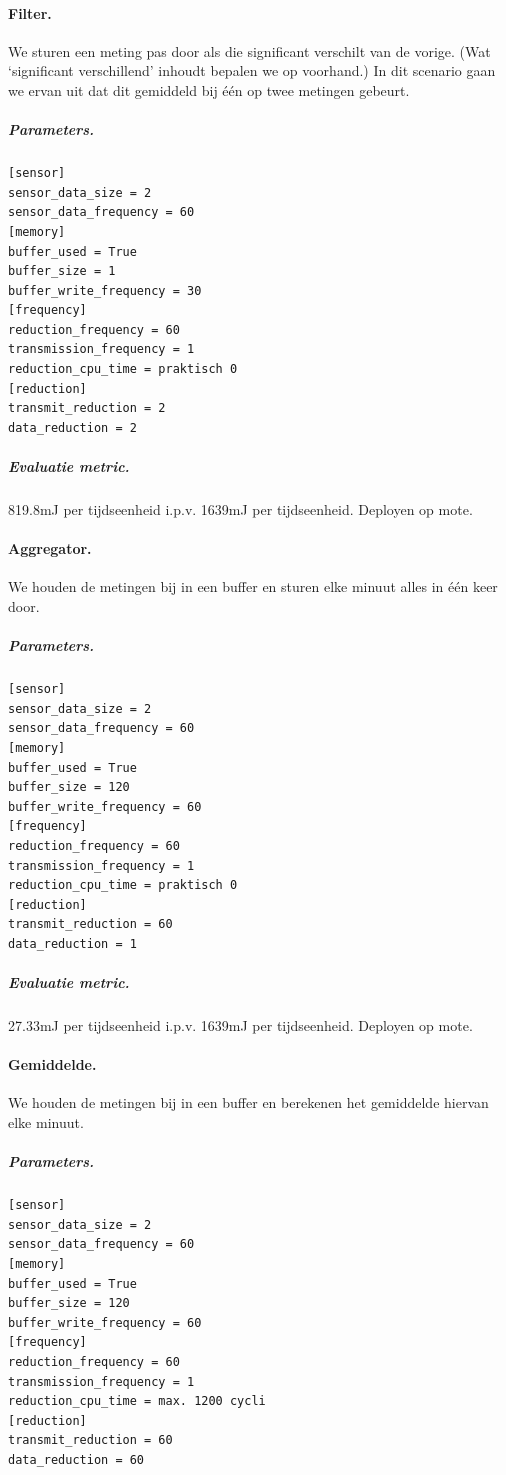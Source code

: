 \documentclass{article}
\begin{document}
\paragraph{Filter.} We sturen een meting pas door als die significant verschilt
van de vorige. (Wat `significant verschillend' inhoudt bepalen we op voorhand.)
In dit scenario gaan we ervan uit dat dit gemiddeld bij \'e\'en op twee metingen
gebeurt.

\subparagraph{Parameters.}
\begin{verbatim}
[sensor]
sensor_data_size = 2
sensor_data_frequency = 60
[memory]
buffer_used = True
buffer_size = 1
buffer_write_frequency = 30
[frequency]
reduction_frequency = 60
transmission_frequency = 1
reduction_cpu_time = praktisch 0
[reduction]
transmit_reduction = 2
data_reduction = 2
\end{verbatim}
\subparagraph{Evaluatie metric.} 819.8mJ per tijdseenheid i.p.v. 1639mJ per tijdseenheid. Deployen op mote.

\paragraph{Aggregator.} We houden de metingen bij in een buffer en sturen elke
minuut alles in \'e\'en keer door.

\subparagraph{Parameters.}
\begin{verbatim}
[sensor]
sensor_data_size = 2
sensor_data_frequency = 60
[memory]
buffer_used = True
buffer_size = 120
buffer_write_frequency = 60
[frequency]
reduction_frequency = 60
transmission_frequency = 1
reduction_cpu_time = praktisch 0
[reduction]
transmit_reduction = 60
data_reduction = 1
\end{verbatim}
\subparagraph{Evaluatie metric.} 27.33mJ  per tijdseenheid i.p.v. 1639mJ per tijdseenheid. Deployen op mote.

\paragraph{Gemiddelde.} We houden de metingen bij in een buffer en berekenen het
gemiddelde hiervan elke minuut.

\subparagraph{Parameters.}
\begin{verbatim}
[sensor]
sensor_data_size = 2
sensor_data_frequency = 60
[memory]
buffer_used = True
buffer_size = 120
buffer_write_frequency = 60
[frequency]
reduction_frequency = 60
transmission_frequency = 1
reduction_cpu_time = max. 1200 cycli
[reduction]
transmit_reduction = 60
data_reduction = 60
\end{verbatim}
\end{document}
